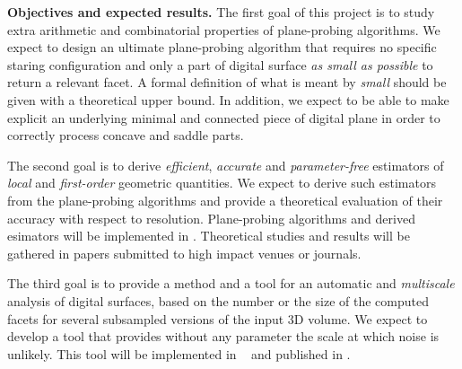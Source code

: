 \noindent\textbf{Objectives and expected results.}
The first goal of this project is to study extra arithmetic and combinatorial properties
of plane-probing algorithms. We expect to design an ultimate plane-probing algorithm that requires
no specific staring configuration and only a part of digital surface \emph{as small as possible}
to return a relevant facet. A formal definition of what is meant by \emph{small} should be given
with a theoretical upper bound.
In addition, we expect to be able to make explicit an underlying minimal and connected piece of
digital plane in order to correctly process concave and saddle parts. 


The second goal is to derive \emph{efficient}, \emph{accurate} and \emph{parameter-free} estimators
of \emph{local} and \emph{first-order} geometric quantities. We expect to derive such estimators from
the plane-probing algorithms and provide a theoretical evaluation of their accuracy with respect to
resolution. Plane-probing algorithms and derived esimators will be implemented in \DGtal. %
Theoretical studies and results will be gathered in papers submitted to high impact venues or journals. 

The third goal is to provide a method and a tool for an automatic and \emph{multiscale} analysis of digital surfaces,
based on the number or the size of the computed facets for several subsampled versions of the input 3D volume. 
We expect to develop a tool that provides without any parameter the scale at which noise is unlikely.
This tool will be implemented in \DGtalTools~ and published in \IPOL. 






